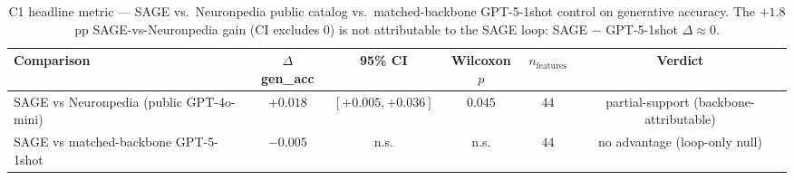 \begin{table}[t]
\centering
\caption{C1 headline metric --- SAGE vs.\ Neuronpedia public catalog vs.\ matched-backbone GPT-5-1shot control on generative accuracy. The $+1.8$pp SAGE-vs-Neuronpedia gain (CI excludes 0) is not attributable to the SAGE loop: SAGE $-$ GPT-5-1shot $\Delta \approx 0$.}
\label{tab:c1_comparison}
\begin{tabular}{lccccc}
\toprule
Comparison & $\Delta$ gen\_acc & 95\% CI & Wilcoxon $p$ & $n_{\text{features}}$ & Verdict \\
\midrule
SAGE vs Neuronpedia (public GPT-4o-mini) & $+0.018$ & $[+0.005, +0.036]$ & $0.045$ & $44$ & partial-support (backbone-attributable) \\
SAGE vs matched-backbone GPT-5-1shot & $-0.005$ & n.s. & n.s. & $44$ & no advantage (loop-only null) \\
\bottomrule
\end{tabular}
\end{table}

